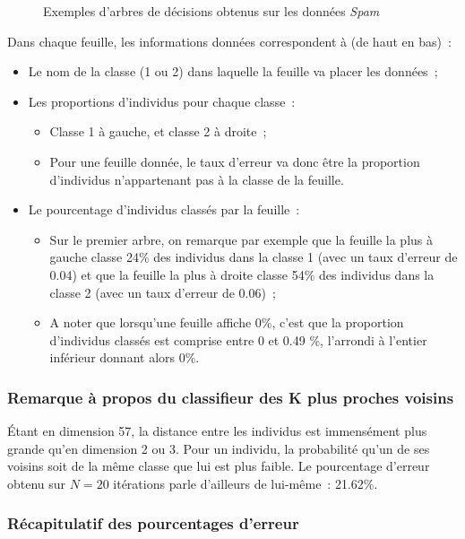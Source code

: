 \documentclass[a4paper,10pt]{report}
\begin{document}
\begin{figure}[H]
\begin{subfigure}[b]{0.45\linewidth}
		\label{fig:arbre-decision-spam-complexe}%
	\end{subfigure}%
	\caption{\small Exemples d'arbres de décisions obtenus sur les données \textit{Spam}}
	\label{fig:arbre-decision-spam}%
\end{figure}

Dans chaque feuille, les informations données correspondent à (de haut en bas)~:
\begin{itemize}
	\item Le nom de la classe (1 ou 2) dans laquelle la feuille va placer les données~;
	\item Les proportions d'individus pour chaque classe~:
	\begin{itemize}
		\item Classe 1 à gauche, et classe 2 à droite~;
		\item Pour une feuille donnée, le taux d'erreur va donc être la proportion d'individus n'appartenant pas à la classe de la feuille.
	\end{itemize}
	\item Le pourcentage d'individus classés par la feuille~:
	\begin{itemize}
		\item Sur le premier arbre, on remarque par exemple que la feuille la plus à gauche classe 24\% des individus dans la classe 1 (avec un taux d'erreur de 0.04) et que la feuille la plus à droite classe 54\% des individus dans la classe 2 (avec un taux d'erreur de 0.06)~;
		\item A noter que lorsqu'une feuille affiche 0\%, c'est que la proportion d'individus classés est comprise entre 0 et 0.49 \%, l'arrondi à l'entier inférieur donnant alors 0\%.
	\end{itemize}
\end{itemize}


\subsubsection{Remarque à propos du classifieur des K plus proches voisins}

Étant en dimension 57, la distance entre les individus est immensément plus grande qu'en dimension 2 ou 3. Pour un individu, la probabilité qu'un de ses voisins soit de la même classe que lui est plus faible. Le pourcentage d'erreur obtenu sur $N=20$ itérations parle d'ailleurs de lui-même~: 21.62\%.

\subsubsection{Récapitulatif des pourcentages d'erreur}
\end{document}
